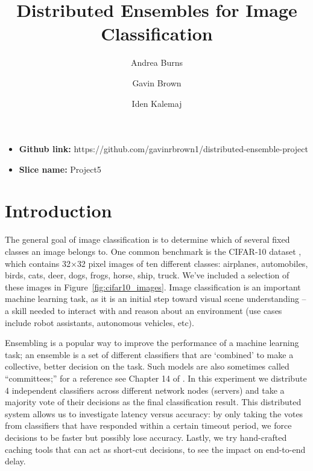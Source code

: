 \documentclass[12pt]{article}
\title{\vspace{-5ex} Distributed Ensembles for Image Classification}
\author{Andrea Burns \and Gavin Brown \and Iden Kalemaj}
\date{\vspace{-5ex}}
\begin{document}
\maketitle
\begin{itemize}
	\item \textbf{Github link:} https://github.com/gavinrbrown1/distributed-ensemble-project
	\item \textbf{Slice name:} Project5
\end{itemize}
\vspace{-2ex}
\section{Introduction}

The general goal of image classification is to determine which of several fixed classes an image belongs to. 
One common benchmark is the CIFAR-10 dataset \cite{cifar10}, which contains 32$\times$32 pixel images of ten different classes: airplanes, automobiles, birds, cats, deer, dogs, frogs, horse, ship, truck.
We've included a selection of these images in Figure~\ref{fig:cifar10_images}.
Image classification is an important machine learning task, as it is an initial step toward visual scene understanding -- a skill needed to interact with and reason about an environment (use cases include robot assistants, autonomous vehicles, etc).

Ensembling is a popular way to improve the performance of a machine learning task; an ensemble is a set of different classifiers that are ‘combined’ to make a collective, better decision on the task. 
Such models are also sometimes called ``committees;'' for a reference see Chapter 14 of \cite{bishop}.
In this experiment we distribute 4 independent classifiers across different network nodes (servers) and take a majority vote of their decisions as the final classification result.
This distributed system allows us to investigate latency versus accuracy: by only taking the votes from classifiers that have responded within a certain timeout period, we force decisions to be faster but possibly lose accuracy.
Lastly, we try hand-crafted caching tools that can act as short-cut decisions, to see the impact on end-to-end delay.
\end{document}
